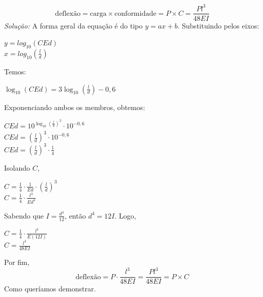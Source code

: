 

\begin{equation*}
    \text{deflexão} = \text{carga} \times \text{conformidade} = P \times C = \frac{Pl^3}{48EI} 
\end{equation*}
\textit{Solução:}
A forma geral da equação é do tipo $y = ax + b$. Substituindo pelos eixos:
\begin{center}
     $y=log_{10}(CEd)$ \\
     \vspace{0,2cm}
     $x=log_{10}(\frac{l}{d})$
\end{center}
Temos: 
\begin{center}
    $\log_{10}(CEd) = 3 \log_{10}(\frac{l}{d}) - 0,6$ 
\end{center}
Exponenciando ambos os membros, obtemos:
\begin{center}
    $CEd = 10^{\log_{10}(\frac{l}{d})^3} \cdot 10^{-0,6}$ \\
    \vspace{0,2cm}
    $CEd = (\frac{l}{d})^3 \cdot 10^{-0,6}$ \\
    \vspace{0,2cm}
    $CEd = (\frac{l}{d})^3 \cdot \frac{1}{4}$ \\
\end{center}
Isolando $C$, 
\begin{center}
    $C = \frac{1}{4}\cdot\frac{1}{Ed}\cdot(\frac{l}{d})^3$ \\
    \vspace{0,2cm}
    $C = \frac{1}{4}\cdot\frac{l^3}{Ed^4}$ \\
\end{center}
Sabendo que $I = \frac{d^4}{12}$, então $d^4=12I$. Logo, 
\begin{center}
     $C = \frac{1}{4}\cdot\frac{l^3}{E(12I)}$ \\
     \vspace{0,2cm}
      $C = \frac{l^3}{48EI}$ \\
\end{center}
Por fim,
\begin{equation*}
    \text{deflexão} = P\cdot\frac{l^3}{48EI} = \frac{Pl^3}{48EI} = P \times C
\end{equation*}
Como queríamos demonstrar.